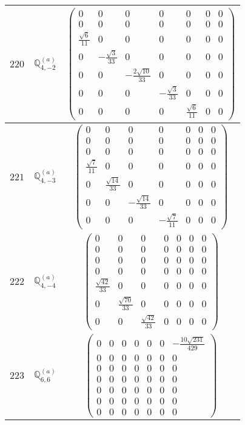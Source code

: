 \documentclass[fleqn,8pt,landscape]{jsarticle}
\begin{document}
\begin{center}
\begin{longtable}{ccc}
$ 220 $ & $ \mathbb{Q}_{4,-2}^{(a)} $ & $ \begin{pmatrix} 0 & 0 & 0 & 0 & 0 & 0 & 0 \\ 0 & 0 & 0 & 0 & 0 & 0 & 0 \\ \frac{\sqrt{6}}{11} & 0 & 0 & 0 & 0 & 0 & 0 \\ 0 & - \frac{\sqrt{3}}{33} & 0 & 0 & 0 & 0 & 0 \\ 0 & 0 & - \frac{2 \sqrt{10}}{33} & 0 & 0 & 0 & 0 \\ 0 & 0 & 0 & - \frac{\sqrt{3}}{33} & 0 & 0 & 0 \\ 0 & 0 & 0 & 0 & \frac{\sqrt{6}}{11} & 0 & 0 \end{pmatrix} $ \\ \hline
$ 221 $ & $ \mathbb{Q}_{4,-3}^{(a)} $ & $ \begin{pmatrix} 0 & 0 & 0 & 0 & 0 & 0 & 0 \\ 0 & 0 & 0 & 0 & 0 & 0 & 0 \\ 0 & 0 & 0 & 0 & 0 & 0 & 0 \\ \frac{\sqrt{7}}{11} & 0 & 0 & 0 & 0 & 0 & 0 \\ 0 & \frac{\sqrt{14}}{33} & 0 & 0 & 0 & 0 & 0 \\ 0 & 0 & - \frac{\sqrt{14}}{33} & 0 & 0 & 0 & 0 \\ 0 & 0 & 0 & - \frac{\sqrt{7}}{11} & 0 & 0 & 0 \end{pmatrix} $ \\ \hline
$ 222 $ & $ \mathbb{Q}_{4,-4}^{(a)} $ & $ \begin{pmatrix} 0 & 0 & 0 & 0 & 0 & 0 & 0 \\ 0 & 0 & 0 & 0 & 0 & 0 & 0 \\ 0 & 0 & 0 & 0 & 0 & 0 & 0 \\ 0 & 0 & 0 & 0 & 0 & 0 & 0 \\ \frac{\sqrt{42}}{33} & 0 & 0 & 0 & 0 & 0 & 0 \\ 0 & \frac{\sqrt{70}}{33} & 0 & 0 & 0 & 0 & 0 \\ 0 & 0 & \frac{\sqrt{42}}{33} & 0 & 0 & 0 & 0 \end{pmatrix} $ \\ \hline
$ 223 $ & $ \mathbb{Q}_{6,6}^{(a)} $ & $ \begin{pmatrix} 0 & 0 & 0 & 0 & 0 & 0 & - \frac{10 \sqrt{231}}{429} \\ 0 & 0 & 0 & 0 & 0 & 0 & 0 \\ 0 & 0 & 0 & 0 & 0 & 0 & 0 \\ 0 & 0 & 0 & 0 & 0 & 0 & 0 \\ 0 & 0 & 0 & 0 & 0 & 0 & 0 \\ 0 & 0 & 0 & 0 & 0 & 0 & 0 \\ 0 & 0 & 0 & 0 & 0 & 0 & 0 \end{pmatrix} $ \\ \hline

\end{longtable}
\end{center}
\end{document}
